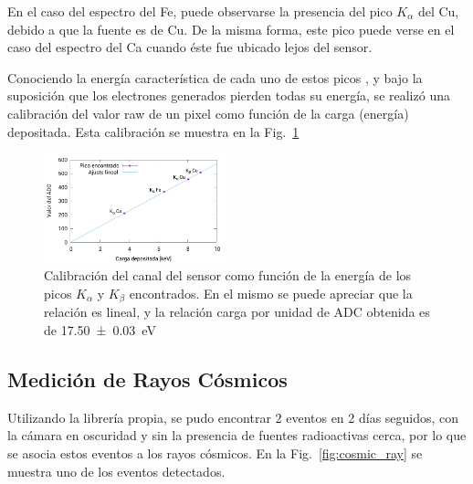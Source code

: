 \documentclass[twoside,twocolumn]{article}
\begin{document}
      En el caso del espectro del Fe, puede observarse la presencia del pico $K_\alpha$ del Cu, debido a que la fuente es de Cu.
      De la misma forma, este pico puede verse en el caso del espectro del Ca cuando éste fue ubicado lejos del sensor.

      Conociendo la energía característica de cada uno de estos picos \cite{xraybooklet},
      y bajo la suposición que los electrones generados pierden todas su energía, %
      se realizó una calibración del valor raw de un pixel como función de la carga (energía) depositada.
      Esta calibración se muestra en la Fig.~\ref{fig:x-ray_calibration}

      \begin{figure}[h]
        \includegraphics[width=0.47\textwidth]{figures/x-ray_calibration}
        \caption{Calibración del canal del sensor como función de la energía de
          los picos $K_{\alpha}$ y $K_{\beta}$ encontrados.
          En el mismo se puede apreciar que la relación es lineal,
          y la relación carga por unidad de ADC obtenida es de \SI{17.50(3)}{\eV}
        }
        \label{fig:x-ray_calibration}
      \end{figure}

    \subsection{Medición de Rayos Cósmicos}\label{sec:results:cosmic_ray}
      Utilizando la librería propia, se pudo encontrar $2$ %
      eventos en 2 días seguidos, con la cámara en oscuridad y sin la presencia de fuentes radioactivas cerca,
      por lo que se asocia estos eventos a los rayos cósmicos.
      En la Fig.~\ref{fig:cosmic_ray} se muestra uno de los eventos detectados.
\end{document}
